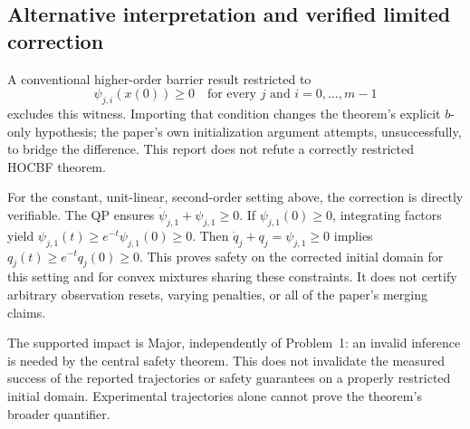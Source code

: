 \documentclass[10pt]{article}
\begin{document}
\subsection*{Alternative interpretation and verified limited correction}
A conventional higher-order barrier result restricted to \[\psi_{j,i}(x(0))\ge0\quad
 \text{for every }j\text{ and }i=0,\ldots,m-1\] excludes this witness. Importing that condition changes the theorem’s explicit \(b\)-only hypothesis; the paper’s own initialization argument attempts, unsuccessfully, to bridge the difference. This report does not refute a correctly restricted HOCBF theorem.\par
For the constant, unit-linear, second-order setting above, the correction is directly verifiable. The QP ensures \(\dot\psi_{j,1}+\psi_{j,1}\ge0\). If \(\psi_{j,1}(0)\ge0\), integrating factors yield \(\psi_{j,1}(t)\ge e^{-t}\psi_{j,1}(0)\ge0\). Then \(\dot q_j+q_j=\psi_{j,1}\ge0\) implies \(q_j(t)\ge e^{-t}q_j(0)\ge0\). This proves safety on the corrected initial domain for this setting and for convex mixtures sharing these constraints. It does not certify arbitrary observation resets, varying penalties, or all of the paper’s merging claims.\par
The supported impact is Major, independently of Problem 1: an invalid inference is needed by the central safety theorem. This does not invalidate the measured success of the reported trajectories or safety guarantees on a properly restricted initial domain. Experimental trajectories alone cannot prove the theorem’s broader quantifier.\par
\end{document}
